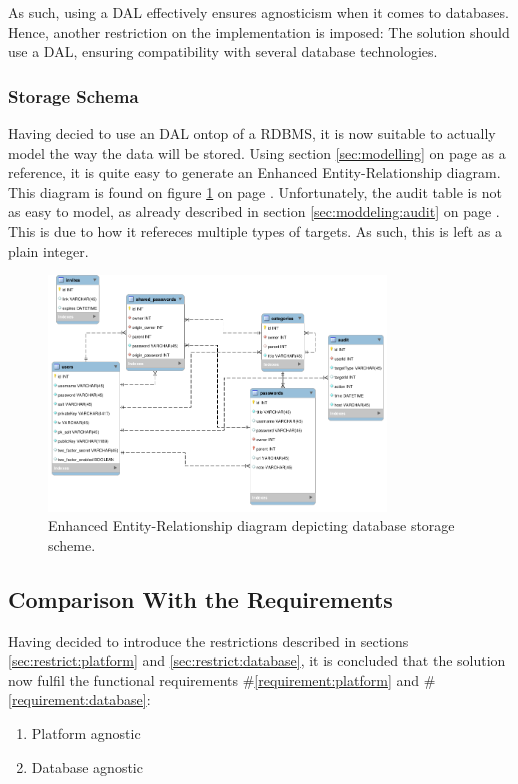 			As such, using a DAL effectively ensures agnosticism when it comes to databases. Hence, another restriction on the implementation is imposed: The solution should use a DAL, ensuring compatibility with several database technologies.	

			\subsubsection{Storage Schema}
				Having decied to use an DAL ontop of a RDBMS, it is now suitable to actually model the way the data will be stored. Using section \ref{sec:modelling} on page \pageref{sec:modelling} as a reference, it is quite easy to generate an Enhanced Entity-Relationship diagram. This diagram is found on figure \ref{fig:eer} on page \pageref{fig:eer}. Unfortunately, the audit table is not as easy to model, as already described in section \ref{sec:moddeling:audit} on page \pageref{sec:moddeling:audit}. This is due to how it refereces multiple types of targets. As such, this is left as a plain integer.

				\begin{figure}[p]
					\centering
					\includegraphics[width=0.8\textwidth]{figures/design/png/database2.png}
					\caption{Enhanced Entity-Relationship diagram depicting database storage scheme.}
					\label{fig:eer}
				\end{figure}
		\subsection{Comparison With the Requirements}
			\label{requirement:fulfilled:database}
			\label{requirement:fulfilled:platform}

			Having decided to introduce the restrictions described in sections \ref{sec:restrict:platform} and \ref{sec:restrict:database}, it is concluded that the solution now fulfil the functional requirements \#\ref{requirement:platform} and \#\ref{requirement:database}:
			\vspace{-3ex}\begin{enumerate}
				\setlength\itemsep{0.1em}
				\setcounter{enumi}{7-1}
				\item Platform agnostic
				\item Database agnostic
			\end{enumerate}

